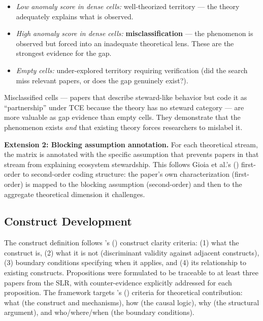 \begin{itemize}
    \item \textit{Low anomaly score in dense cells:} well-theorized territory --- the theory adequately explains what is observed.
    \item \textit{High anomaly score in dense cells:} \textbf{misclassification} --- the phenomenon is observed but forced into an inadequate theoretical lens. These are the strongest evidence for the gap.
    \item \textit{Empty cells:} under-explored territory requiring verification (did the search miss relevant papers, or does the gap genuinely exist?).
\end{itemize}

Misclassified cells --- papers that describe steward-like behavior but code it as ``partnership'' under TCE because the theory has no steward category --- are more valuable as gap evidence than empty cells. They demonstrate that the phenomenon exists \textit{and} that existing theory forces researchers to mislabel it.

\textbf{Extension 2: Blocking assumption annotation.} For each theoretical stream, the matrix is annotated with the specific assumption that prevents papers in that stream from explaining ecosystem stewardship. This follows Gioia et al.'s (\citeyear{Gioia2013}) first-order to second-order coding structure: the paper's own characterization (first-order) is mapped to the blocking assumption (second-order) and then to the aggregate theoretical dimension it challenges.

\subsection{Construct Development}

The construct definition follows \citeauthor{Suddaby2010}'s (\citeyear{Suddaby2010}) construct clarity criteria: (1) what the construct is, (2) what it is not (discriminant validity against adjacent constructs), (3) boundary conditions specifying when it applies, and (4) its relationship to existing constructs. Propositions were formulated to be traceable to at least three papers from the SLR, with counter-evidence explicitly addressed for each proposition. The framework targets \citeauthor{Whetten1989}'s (\citeyear{Whetten1989}) criteria for theoretical contribution: what (the construct and mechanisms), how (the causal logic), why (the structural argument), and who/where/when (the boundary conditions).
